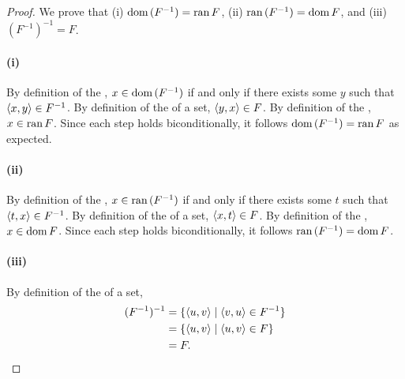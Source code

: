 \documentclass{report}
\begin{document}
  \begin{proof}
    We prove that (i) $\mathop{\text{dom}}{(F^{-1})} = \mathop{\text{ran}}{F}$, (ii)
      $\mathop{\text{ran}}{(F^{-1})} = \mathop{\text{dom}}{F}$, and (iii) $(F^{-1})^{-1} = F$.

    \paragraph{(i)}%

      By definition of the , $x \in \mathop{\text{dom}}{(F^{-1})}$ if and
        only if there exists some $y$ such that $\left< x, y \right> \in F^{-1}$.
      By definition of the  of a set,
        $\left< y, x \right> \in F$.
      By definition of the , $x \in \mathop{\text{ran}}{F}$.
      Since each step holds biconditionally, it follows
        $\mathop{\text{dom}}{(F^{-1})} = \mathop{\text{ran}}{F}$ as expected.

    \paragraph{(ii)}%

      By definition of the , $x \in \mathop{\text{ran}}{(F^{-1})}$ if and
        only if there exists some $t$ such that $\left< t, x \right> \in F^{-1}$.
      By definition of the  of a set,
        $\left< x, t \right> \in F$.
      By definition of the , $x \in \mathop{\text{dom}}{F}$.
      Since each step holds biconditionally, it follows
        $\mathop{\text{ran}}{(F^{-1})} = \mathop{\text{dom}}{F}$.

    \paragraph{(iii)}%

      By definition of the  of a set,
        \begin{align*}
          (F^{-1})^{-1}
            & = \{\left< u, v \right> \mid \left< v, u \right> \in F^{-1}\} \\
            & = \{\left< u, v \right> \mid \left< u, v \right> \in F\} \\
            & = F.
        \end{align*}

  \end{proof}

\subsection{}%
\end{document}
